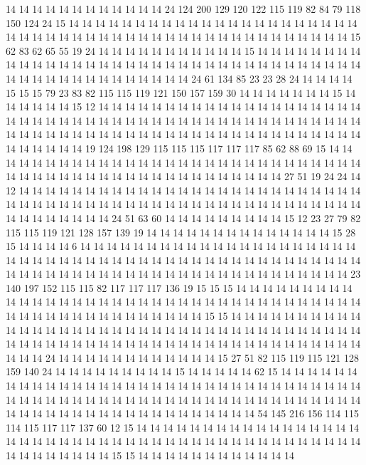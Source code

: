 14 14 14 14 14 14 14 14 14 14 14 14 24 124 200 129 120 122 115 119
82 84 79 118 150 124 24 15 14 14 14 14 14 14 14 14 14 14 14 14
14 14 14 14 14 14 14 14 14 14 14 14 14 14 14 14 14 14 14 14
14 14 14 14 14 14 14 14 14 14 14 14 14 14 14 14 15 62 83 62
65 55 19 24 14 14 14 14 14 14 14 14 14 14 14 15 14 14 14 14
14 14 14 14 14 14 14 14 14 14 14 14 14 14 14 14 14 14 14 14
14 14 14 14 14 14 14 14 14 14 14 14 14 14 14 14 14 14 14 14
14 14 14 14 14 24 61 134 85 23 23 28 24 14 14 14 14 15 15 15
79 23 83 82 115 115 119 121 150 157 159 30 14 14 14 14 14 14 14 15
14 14 14 14 14 14 15 12 14 14 14 14 14 14 14 14 14 14 14 14
14 14 14 14 14 14 14 14 14 14 14 14 14 14 14 14 14 14 14 14
14 14 14 14 14 14 14 14 14 14 14 14 14 14 14 14 14 14 14 14
14 14 14 14 14 14 14 14 14 14 14 14 14 14 14 14 14 14 14 14
14 14 14 14 14 14 14 14 19 124 198 129 115 115 115 117 117 117 85 62
88 69 15 14 14 14 14 14 14 14 14 14 14 14 14 14 14 14 14 14
14 14 14 14 14 14 14 14 14 14 14 14 14 14 14 14 14 14 14 14
14 14 14 14 14 14 14 14 14 14 14 14 14 27 51 19 24 24 14 12
14 14 14 14 14 14 14 14 14 14 14 14 14 14 14 14 14 14 14 14
14 14 14 14 14 14 14 14 14 14 14 14 14 14 14 14 14 14 14 14
14 14 14 14 14 14 14 14 14 14 14 14 14 14 14 14 14 14 14 14
14 24 51 63 60 14 14 14 14 14 14 14 14 14 15 12 23 27 79 82
115 115 119 121 128 157 139 19 14 14 14 14 14 14 14 14 14 14 14 14
14 14 15 28 15 14 14 14 14 6 14 14 14 14 14 14 14 14 14 14
14 14 14 14 14 14 14 14 14 14 14 14 14 14 14 14 14 14 14 14
14 14 14 14 14 14 14 14 14 14 14 14 14 14 14 14 14 14 14 14
14 14 14 14 14 14 14 14 14 14 14 14 14 14 14 14 14 14 14 14
14 14 14 14 23 140 197 152 115 115 82 117 117 117 136 19 15 15 15 14
14 14 14 14 14 14 14 14 14 14 14 14 14 14 14 14 14 14 14 14
14 14 14 14 14 14 14 14 14 14 14 14 14 14 14 14 14 14 14 14
14 14 14 14 14 14 14 14 14 14 15 15 14 14 14 14 14 14 14 14
14 14 14 14 14 14 14 14 14 14 14 14 14 14 14 14 14 14 14 14
14 14 14 14 14 14 14 14 14 14 14 14 14 14 14 14 14 14 14 14
14 14 14 14 14 14 14 14 14 14 14 14 14 14 14 14 14 14 14 24
14 14 14 14 14 14 14 14 14 14 14 14 15 27 51 82 115 119 115 121
128 159 140 24 14 14 14 14 14 14 14 14 14 15 14 14 14 14 14 62
15 14 14 14 14 14 14 14 14 14 14 14 14 14 14 14 14 14 14 14
14 14 14 14 14 14 14 14 14 14 14 14 14 14 14 14 14 14 14 14
14 14 14 14 14 14 14 14 14 14 14 14 14 14 14 14 14 14 14 14
14 14 14 14 14 14 14 14 14 14 14 14 14 14 14 14 14 14 14 14
54 145 216 156 114 115 114 115 117 117 137 60 12 15 14 14 14 14 14 14
14 14 14 14 14 14 14 14 14 14 14 14 14 14 14 14 14 14 14 14
14 14 14 14 14 14 14 14 14 14 14 14 14 14 14 14 14 14 14 14
14 14 14 14 14 14 15 15 14 14 14 14 14 14 14 14 14 14 14 14
